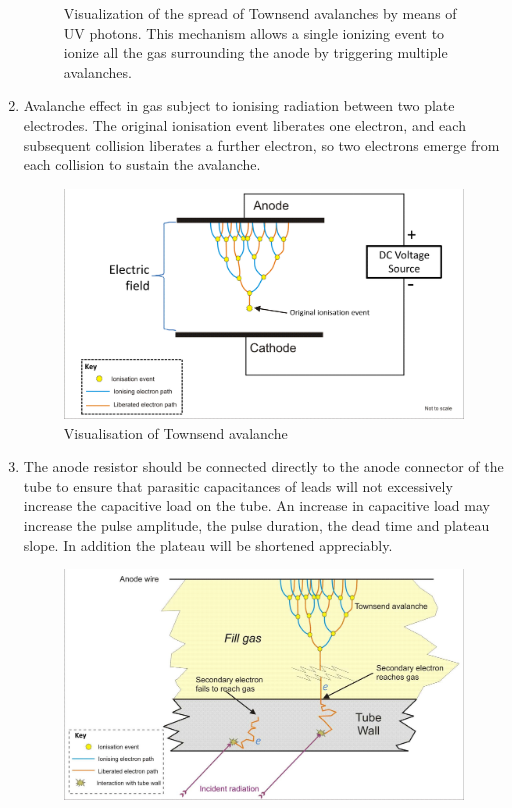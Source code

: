 \documentclass[%
 reprint,
nofootinbib,
 amsmath,amssymb,
 aps,
floatfix,
]{revtex4-2}
\begin{document}
\begin{enumerate}
\begin{figure}
        \caption{Visualization of the spread of Townsend avalanches by means of UV photons. This mechanism allows a single ionizing event to ionize all the gas surrounding the anode by triggering multiple avalanches.}
        \label{fig:disc-2}
    \end{figure}
    \item Avalanche effect in gas subject to ionising radiation between two plate electrodes. The original ionisation event liberates one electron, and each subsequent collision liberates a further electron, so two electrons emerge from each collision to sustain the avalanche.
    \begin{figure}
        \centering
        \includegraphics[scale = 0.2]{Figures/Electron_avalanche.png}
        \caption{Visualisation of Townsend avalanche}
        \label{fig:disc-3}
    \end{figure}
    \item The anode resistor should be connected directly to the anode connector of the tube to ensure that parasitic capacitances of leads will not excessively increase the capacitive load on the tube. An increase in capacitive load may increase the pulse amplitude, the pulse duration, the dead time and plateau slope. In addition the plateau will be shortened appreciably.
    \begin{figure}
        \centering
        \includegraphics[scale = 0.29]{Figures/Geiger_gamma_interaction.jpg}

\end{figure}
\end{enumerate}
\end{document}
